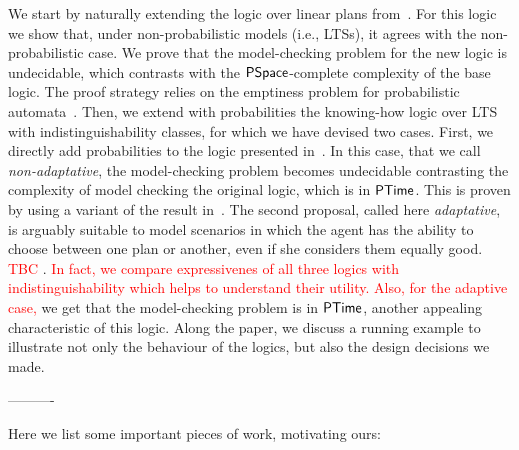 We start by naturally extending the logic over linear plans from~\cite{Wang15lori,Wang16,Wang2016}.  For this logic we show that, under non-probabilistic models (i.e., LTSs), it agrees with the non-probabilistic case. We prove that the model-checking problem for the new logic is undecidable,  which contrasts  with the ${\rm\textsf{PSpace}}$-complete complexity of the base logic. The proof strategy relies on the emptiness problem for probabilistic automata~\cite{MadaniHC99}. Then, we extend with probabilities the knowing-how logic over LTS with indistinguishability classes, for which we have devised two cases.  First, we directly add probabilities to the logic presented in~\cite{AFSVQ21,AFSVQ23}.  In this case,  that we call \emph{non-adaptative}, the model-checking problem becomes undecidable  contrasting the complexity of model checking the original logic, which is in  ${\rm\textsf{PTime}}$. This is proven by using a variant of the result in~\cite{MadaniHC99}. The second proposal, called here \emph{adaptative}, is arguably suitable to model scenarios in which the agent has the ability to choose between one plan or another, even if she considers them equally good. \textcolor{red}{TBC} .  \textcolor{red}{In fact, we compare expressivenes of all three logics with indistinguishability which helps to understand their utility. Also, for the adaptive case,} %
we get that the model-checking problem is in ${\rm\textsf{PTime}}$, another appealing characteristic of this logic. Along the paper, we discuss a running example to illustrate not only the behaviour of the logics, but also the design decisions we made. 

\iffalse
---------- 

Here we list some important pieces of work, motivating ours:

